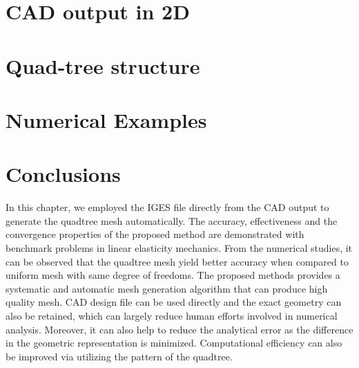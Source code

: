 \section{CAD output in 2D}
\label{qt_sc:iges}


\section{Quad-tree structure}
\label{qt_sc:quadtree}


% 


\section{Numerical Examples}



% 



\section{Conclusions}
In this chapter, we employed the IGES file directly from the CAD output to generate the quadtree mesh automatically.
The accuracy, effectiveness and the convergence properties of the proposed method are demonstrated with benchmark problems in linear elasticity mechanics.
From the numerical studies, it can be observed that the quadtree mesh yield better accuracy when compared to uniform mesh with same degree of freedoms.
The proposed methods provides a systematic and automatic mesh generation algorithm that can produce high quality mesh.
CAD design file can be used directly and the exact geometry can also be retained, which can largely reduce human efforts involved in numerical analysis.
Moreover, it can also help to reduce the analytical error as the difference in the geometric representation is minimized.
Computational efficiency can also be improved via utilizing the pattern of the quadtree.
\pagebreak
